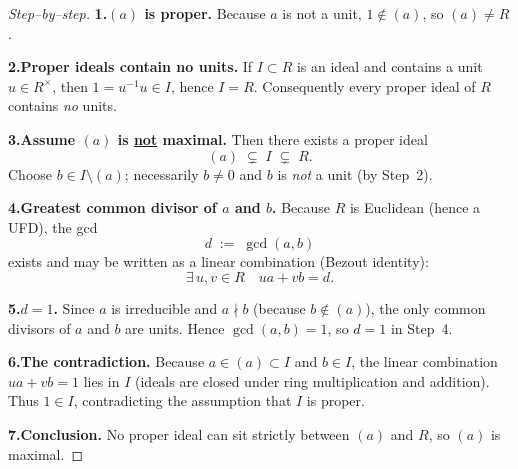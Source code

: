 \documentclass[12pt]{article}
\theoremstyle{definition} %
\theoremstyle{plain} %
\begin{document}
    \begin{proof}[Step--by--step]
    \textbf{1.\;$(a)$ is proper.}  
    Because $a$ is not a unit, $1\notin(a)$, so $(a)\neq R$.
    
    \medskip
    \textbf{2.\;Proper ideals contain no units.}  
    If $I\subset R$ is an ideal and contains a unit $u\in R^{\times}$,
    then $1=u^{-1}u\in I$, hence $I=R$.
    Conse\-quently every proper ideal of $R$ contains \emph{no} units.
    
    \medskip
    \textbf{3.\;Assume $(a)$ is \underline{not} maximal.}  
    Then there exists a proper ideal
    \[
       (a)\;\subsetneq\;I\;\subsetneq\;R.
    \]
    Choose $b\in I\setminus(a)$; necessarily $b\neq 0$ and $b$ is \emph{not}
    a unit (by Step~2).
    
    \medskip
    \textbf{4.\;Greatest common divisor of $a$ and $b$.}  
    Because $R$ is Euclidean (hence a UFD), the gcd
    \[
       d\;:=\;\gcd(a,b)
    \]
    exists and may be written as a linear combination
    (Bezout identity):
    \[
       \exists\,u,v\in R\quad ua+vb=d.
    \]
    
    \medskip
    \textbf{5.\;$d=1$.}  
    Since $a$ is irreducible and $a\nmid b$ (because $b\notin(a)$),
    the only common divisors of $a$ and $b$ are units.
    Hence $\gcd(a,b)=1$, so $d=1$ in Step~4.
    
    \medskip
    \textbf{6.\;The contradiction.}  
    Because $a\in(a)\subset I$ and $b\in I$, the linear combination
    $ua+vb=1$ lies in $I$ (ideals are closed under
    ring multiplication and addition).  
    Thus $1\in I$, contradicting the assumption that $I$ is proper.
    
    \medskip
    \textbf{7.\;Conclusion.}  
    No proper ideal can sit strictly between $(a)$ and $R$,
    so $(a)$ is maximal.
    \end{proof}
\end{document}
